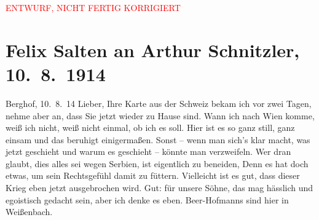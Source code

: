 
\begin{center}
            \textcolor{red}{ENTWURF, NICHT FERTIG KORRIGIERT}
                      \end{center}
            
         
         \renewcommand{\erwaehntePersonen}{Personen: Richard Beer-Hofmann, Paula Beer-Hofmann, Olga Schnitzler, Heinrich Schnitzler, Lili Schnitzler}
         \renewcommand{\erwaehnteOrte}{Orte: Berghof, Schweiz, Serbien, Unterach am Attersee, Weißenbach am Attersee, Wien}
         \renewcommand{\erwaehnteWerke}{}
               \section[Felix Salten an Arthur Schnitzler, 10. 8. 1914]{ Felix Salten an Arthur Schnitzler, 10. 8. 1914}\nopagebreak{}\rehead{ }\begin{ledgroupsized}[t]{13cm}\normalsize\beginnumbering \toendnotes[C]{\smallbreak\pagebreak[2]} 
\toendnotes[C]{\smallbreak}\pstart
           {\pb}Berghof, 10. 8. 14\pend
           \pstart{}Lieber,\pend\pstart
           Ihre Karte aus der Schweiz bekam ich vor zwei
               Tagen, nehme aber an, dass Sie jetzt wieder zu Hause sind. Wann ich nach Wien komme, weiß ich nicht, weiß nicht einmal, ob
               ich es soll. Hier ist es so ganz still, ganz einsam und das beruhigt einigermaßen.
               Sonst – wenn man sich's klar macht, was jetzt geschieht und warum es geschieht –
               könnte man verzweifeln. Wer dran glaubt, dies alles sei wegen Serbien, ist eigentlich zu beneiden, Denn es hat doch etwas, um
               sein Rechtsgefühl damit zu füttern. Vielleicht ist es gut, dass dieser Krieg eben
               jetzt ausgebrochen wird. Gut: für unsere Söhne, das mag hässlich und egoistisch
               gedacht sein, aber ich denke es eben. Beer-Hofmanns sind hier in Weißenbach.

\end{ledgroupsized}

